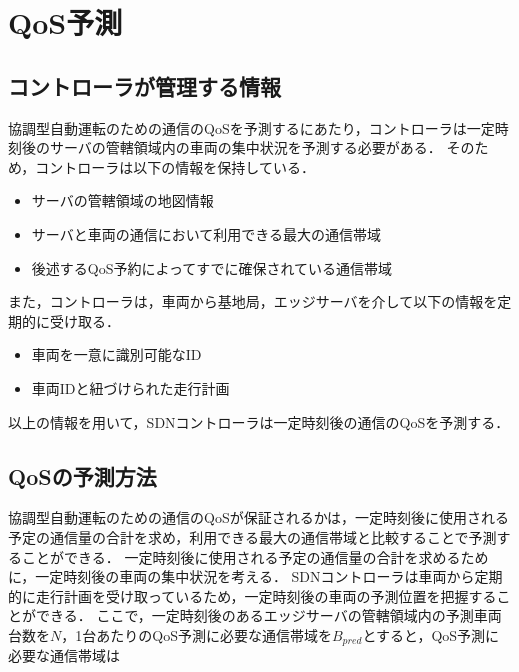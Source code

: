 \documentclass[a4paper,11pt,uplatex]{ujreport}
\begin{document}

\section{QoS予測}
\label{sec:QoS予測}

\subsection{コントローラが管理する情報}

協調型自動運転のための通信のQoSを予測するにあたり，コントローラは一定時刻後のサーバの管轄領域内の車両の集中状況を予測する必要がある．
そのため，コントローラは以下の情報を保持している．

\begin{itemize}
\item サーバの管轄領域の地図情報
\item サーバと車両の通信において利用できる最大の通信帯域
\item 後述するQoS予約によってすでに確保されている通信帯域
\end{itemize}

また，コントローラは，車両から基地局，エッジサーバを介して以下の情報を定期的に受け取る．

\begin{itemize}
\item 車両を一意に識別可能なID
\item 車両IDと紐づけられた走行計画
\end{itemize}

以上の情報を用いて，SDNコントローラは一定時刻後の通信のQoSを予測する．

\subsection{QoSの予測方法}

協調型自動運転のための通信のQoSが保証されるかは，一定時刻後に使用される予定の通信量の合計を求め，利用できる最大の通信帯域と比較することで予測することができる．
一定時刻後に使用される予定の通信量の合計を求めるために，一定時刻後の車両の集中状況を考える．
SDNコントローラは車両から定期的に走行計画を受け取っているため，一定時刻後の車両の予測位置を把握することができる．
ここで，一定時刻後のあるエッジサーバの管轄領域内の予測車両台数を$N$，1台あたりのQoS予測に必要な通信帯域を$B_{pred}$とすると，QoS予測に必要な通信帯域は
\end{document}
